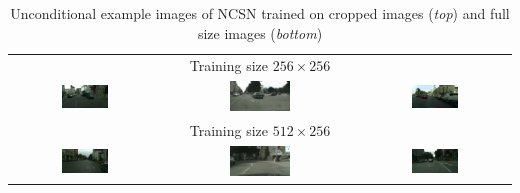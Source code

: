 \begin{table}[] \label{tab:5.3}
    \centering
    \setlength\tabcolsep{-2pt}
    \begin{tabular}{ccc}
        & Training size $256\times256$ & \\
        \includegraphics[width=0.33\textwidth]{Chapters/figures/experiments/crop/1_sample.png} &
        \includegraphics[width=0.33\textwidth]{Chapters/figures/experiments/crop/5_sample.png} &
        \includegraphics[width=0.33\textwidth]{Chapters/figures/experiments/crop/8_sample.png}\\
        & Training size $512\times256$ & \\ 
        \includegraphics[width=0.33\textwidth]{Chapters/figures/experiments/crop/0_uncond_sample.png} &
        \includegraphics[width=0.33\textwidth]{Chapters/figures/experiments/crop/3_uncond_sample.png} &
        \includegraphics[width=0.33\textwidth]{Chapters/figures/experiments/crop/7_uncond_sample.png}
    \end{tabular}
    \caption[Unconditional example images of NCSN trained on cropped images and full size images]{Unconditional example images of NCSN trained on cropped images (\textit{top}) and full size images (\textit{bottom})}
    \label{tab:my_label}
\end{table}

